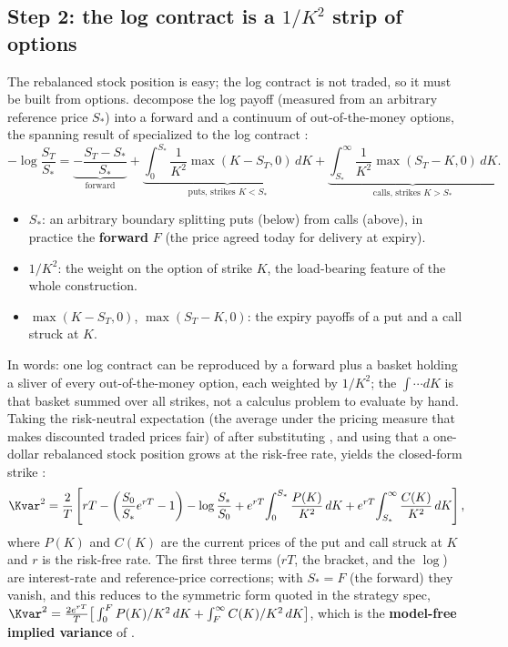 \subsection*{Step 2: the log contract is a $1/K^2$ strip of options}

The rebalanced stock position is easy; the log contract is not traded, so it must be built from options. \citet{Demeterfi1999} decompose the log payoff (measured from an arbitrary reference price $S_*$) into a forward and a continuum of out-of-the-money options, the spanning result of \citet{CarrMadan2002} specialized to the log contract \citep[Eq.~25, p.~18]{Demeterfi1999}:
\begin{equation}
\label{eq:gsvivs:strip}
-\log\frac{S_T}{S_*}
= \underbrace{-\frac{S_T - S_*}{S_*}}_{\text{forward}}
+ \underbrace{\int_0^{S_*}\frac{1}{K^2}\max(K - S_T,0)\,dK}_{\text{puts, strikes }K<S_*}
+ \underbrace{\int_{S_*}^{\infty}\frac{1}{K^2}\max(S_T - K,0)\,dK}_{\text{calls, strikes }K>S_*}.
\end{equation}
\begin{itemize}
  \item $S_*$: an arbitrary boundary splitting puts (below) from calls (above), in practice the \textbf{forward} $F$ (the price agreed today for delivery at expiry).
  \item $1/K^2$: the weight on the option of strike $K$, the load-bearing feature of the whole construction.
  \item $\max(K-S_T,0)$, $\max(S_T-K,0)$: the expiry payoffs of a put and a call struck at $K$.
\end{itemize}
In words: one log contract can be reproduced by a forward plus a basket holding a sliver of every out-of-the-money option, each weighted by $1/K^2$; the $\int\!\cdots dK$ is that basket summed over all strikes, not a calculus problem to evaluate by hand. Taking the risk-neutral expectation (the average under the pricing measure that makes discounted traded prices fair) of  after substituting , and using that a one-dollar rebalanced stock position grows at the risk-free rate, yields the closed-form strike \citep[Eq.~26, p.~19]{Demeterfi1999}:
\begin{equation}
\label{eq:gsvivs:kvar}
\Kvar^2 = \frac{2}{T}\left[ rT - \left(\frac{S_0}{S_*}e^{rT} - 1\right) - \log\frac{S_*}{S_0} + e^{rT}\!\int_0^{S_*}\frac{P(K)}{K^2}\,dK + e^{rT}\!\int_{S_*}^{\infty}\frac{C(K)}{K^2}\,dK \right],
\end{equation}
where $P(K)$ and $C(K)$ are the current prices of the put and call struck at $K$ and $r$ is the risk-free rate. The first three terms ($rT$, the bracket, and the $\log$) are interest-rate and reference-price corrections; with $S_* = F$ (the forward) they vanish, and this reduces to the symmetric form quoted in the strategy spec, $\Kvar^2 = \frac{2e^{rT}}{T}\big[\int_0^F P(K)/K^2\,dK + \int_F^\infty C(K)/K^2\,dK\big]$, which is the \textbf{model-free implied variance} of .

